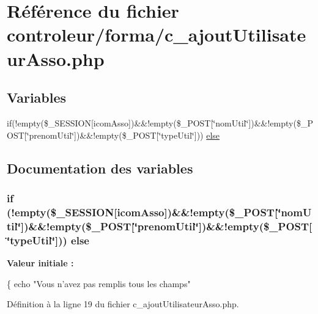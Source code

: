 \hypertarget{c__ajout_utilisateur_asso_8php}{}\section{Référence du fichier controleur/forma/c\+\_\+ajout\+Utilisateur\+Asso.php}
\label{c__ajout_utilisateur_asso_8php}
\subsection*{Variables}
\begin{DoxyCompactItemize}
\item 
if(!empty(\$\+\_\+\+S\+E\+S\+S\+I\+ON\mbox{[}\textquotesingle{}icom\+Asso\textquotesingle{}\mbox{]})\&\&!empty(\$\+\_\+\+P\+O\+ST\mbox{[}\char`\"{}nom\+Util\char`\"{}\mbox{]})\&\&!empty(\$\+\_\+\+P\+O\+ST\mbox{[}\char`\"{}prenom\+Util\char`\"{}\mbox{]})\&\&!empty(\$\+\_\+\+P\+O\+ST\mbox{[}\char`\"{}type\+Util\char`\"{}\mbox{]})) \hyperlink{c__ajout_utilisateur_asso_8php_a5414f12838619056105da1ede50a00b9}{else}
\end{DoxyCompactItemize}


\subsection{Documentation des variables}
\subsubsection[{\texorpdfstring{else}{else}}]{\setlength{\rightskip}{0pt plus 5cm}if (!empty(\$\+\_\+\+S\+E\+S\+S\+I\+ON\mbox{[}\textquotesingle{}icom\+Asso\textquotesingle{}\mbox{]})\&\&!empty(\$\+\_\+\+P\+O\+ST\mbox{[}\char`\"{}nom\+Util\char`\"{}\mbox{]})\&\&!empty(\$\+\_\+\+P\+O\+ST\mbox{[}\char`\"{}prenom\+Util\char`\"{}\mbox{]})\&\&!empty(\$\+\_\+\+P\+O\+ST\mbox{[}\char`\"{}type\+Util\char`\"{}\mbox{]})) else}\hypertarget{c__ajout_utilisateur_asso_8php_a5414f12838619056105da1ede50a00b9}{}\label{c__ajout_utilisateur_asso_8php_a5414f12838619056105da1ede50a00b9}
{\bfseries Valeur initiale \+:}
\begin{DoxyCode}
\{
  echo \textcolor{stringliteral}{"Vous n'avez pas remplis tous les champs"}
\end{DoxyCode}


Définition à la ligne 19 du fichier c\+\_\+ajout\+Utilisateur\+Asso.\+php.


